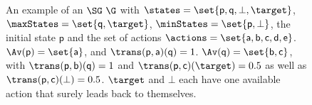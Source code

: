 \begin{figure}[h]

\centering
{}
\caption{An example of an $\SG~\G$ with $\states = \set{\mathsf{p},\mathsf{q},\bot,\target}$, $\maxStates = \set{\mathsf{q},\target}$, $\minStates = \set{\mathsf{p},\bot}$, the initial state $\mathsf{p}$ and the set of actions $\actions = \set{\mathsf{a},\mathsf{b},\mathsf{c},\mathsf{d},\mathsf{e}}$. $\Av(\mathsf{p})=\set{\mathsf{a}}$, and $\trans(\mathsf{p},\mathsf{a})(\mathsf{q})=1$. $\Av(\mathsf{q})=\set{\mathsf{b},\mathsf{c}}$, with $\trans(\mathsf{p},\mathsf{b})(\mathsf{q})=1$ and $\trans(\mathsf{p},\mathsf{c})(\target)=0.5$ as well as $\trans(\mathsf{p},\mathsf{c})(\bot)=0.5$. $\target$ and $\bot$ each have one available action that surely leads back to themselves.}
\label{ex:littleBCEC}
\end{figure}



\iffalse

VI from below in two steps
BVI fails, Illusion
BRTDP below in one simulation if we go to 0, could also never go to 0 and never terminate from below; but this a.s. does not happen; also fails from above

More examples: 
	- VI off by 1 CHECK (red edge smaller than two times epsilon (depends on how term crit is implemented); then two iterations (one to propagate 0.5 to C, one to propagate a very small number to q) => ``no'' change => result 0)
	- littleqCEC with selfloop (takes forever to converge) CHECK
	- Converging EC (Prelim and BVIwo) CHECK
	- Complex BCEC (5 States, without starting state, with a b c d on the exits; also for the things are equal case) CHECK
\fi